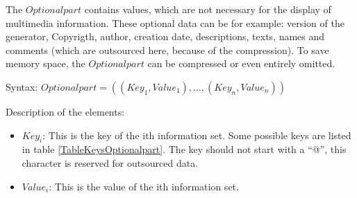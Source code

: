 The $Optionalpart$ contains values, which are not necessary for the display of multimedia information.
These optional data can be for example: version of the generator, Copyrigth, author, creation date, descriptions, texts, names and comments (which are outsourced here, because of the compression).
To save memory space, the $Optionalpart$ can be compressed or even entirely omitted.

\bigskip\noindent
Syntax:
$Optionalpart=( (Key_1, Value_1), \ldots, (Key_n, Value_n))$

\bigskip\noindent
Description of the elements:
\begin{itemize}
 \item $Key_i$: This is the key of the ith information set. Some possible keys are listed in table \ref{TableKeysOptionalpart}. The key should not start with a ``@'', this character is reserved for outsourced data.
 \item $Value_i$: This is the value of the ith information set.
\end{itemize}


